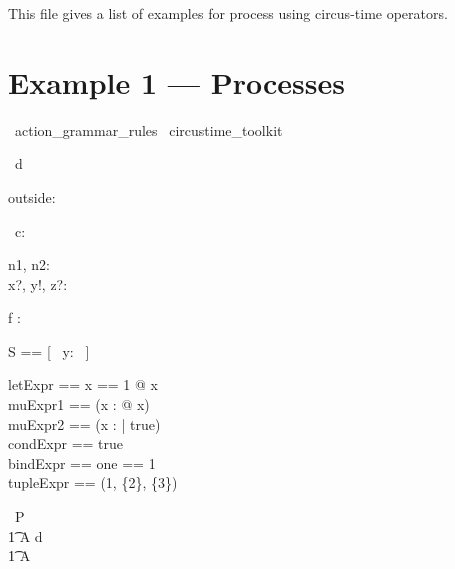 \documentclass{article}
\begin{document}
This file gives a list of examples for process using circus-time operators.   

\section{Example 1 --- Processes}

\begin{zsection}
  \SECTION\ action\_grammar\_rules \parents\ circustime\_toolkit
\end{zsection}

\begin{circus}
     \circchannel\ d \\
\end{circus}

\begin{axdef}
    outside: \nat
\end{axdef}

\begin{circus}
   \circchannel\ c: \nat \cross \nat \cross \nat \cross \nat
\end{circus}

\begin{axdef}
   n1, n2: \nat \\
   x?, y!, z?: \nat
\end{axdef}

\begin{axdef}
   f : \nat \fun \nat \cross \nat
\end{axdef}

\begin{zed}
   S == [~ y: \nat ~]
\end{zed}

\begin{zed}
  letExpr == \LET x == 1 @ x\\
  muExpr1 == (\mu x : \nat @ x)\\
  muExpr2 == (\mu x : \nat | true)\\
  condExpr == \IF true  \\
  bindExpr == \lblot one == 1 \rblot\\
  tupleExpr == (1, \{2\}, \power \{3\})\\
\end{zed}

\begin{circus}
    \circprocess\ P \circdef  \circbegin  \\
    \t1 A \circdef d \then \Skip \\
    \t1 \circspot A \\
    \circend
\end{circus}
\end{document}
